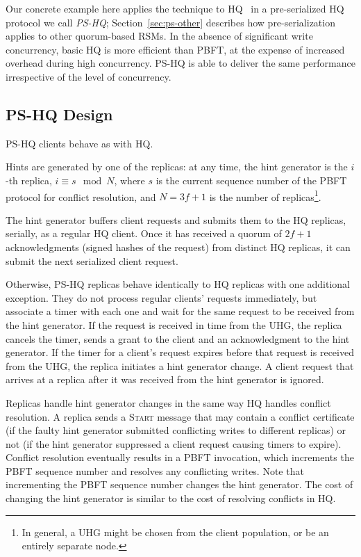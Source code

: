 \documentclass[twocolumn,10pt]{article}
\begin{document}
Our concrete example here applies the technique to
HQ~\cite{hq-replication-osdi-06} in a pre-serialized HQ protocol we
call \emph{PS-HQ}; Section~\ref{sec:ps-other} describes how
pre-serialization applies to other quorum-based RSMs. 
In the absence of significant write concurrency, basic HQ is more
efficient than PBFT, at the expense of increased overhead during high 
concurrency.  PS-HQ is able to deliver the same performance
irrespective of the level of concurrency.

\subsection{PS-HQ Design}

PS-HQ clients behave as with HQ.   

Hints are generated by one of the replicas: at any time, the hint
generator is the $i$-th replica, $i \equiv s \mod N$, where $s$ is the
current sequence number of the PBFT protocol for conflict resolution,
and $N=3f+1$ is the number of replicas\footnote{In general, a
  UHG might be chosen from the client population, or be an entirely
separate node.}.

The hint generator buffers client requests and submits them to the
HQ replicas, serially, as a regular HQ client.  Once it has received a
quorum of $2f+1$ acknowledgments (signed hashes of the request) from
distinct HQ replicas, it can submit the next serialized client
request. %

Otherwise, PS-HQ replicas behave identically to HQ replicas with one
additional exception.  They do not process regular clients' requests
immediately, but associate a timer with each one and wait for the same
request to be received from the hint generator.  If the request is
received in time from the UHG, the replica cancels the timer, sends a
grant to the client and an acknowledgment to the hint generator.  If
the timer for a client's request expires before that request is
received from the UHG, the replica initiates a hint
generator change.  
A client request that arrives at a replica after it was received from
the hint generator is ignored.

Replicas handle hint generator changes in
the same way HQ handles conflict resolution. A replica sends a
\textsc{Start} message that may contain a conflict certificate (if the
faulty hint generator submitted conflicting writes to different
replicas) or not (if the hint generator suppressed a client request
causing timers to expire).  Conflict resolution eventually results in
a PBFT invocation, which increments the PBFT sequence number and
resolves any conflicting writes.  Note that incrementing the PBFT
sequence number changes the hint generator. The cost of
changing the hint generator is similar to the cost of resolving
conflicts in HQ.
\end{document}
